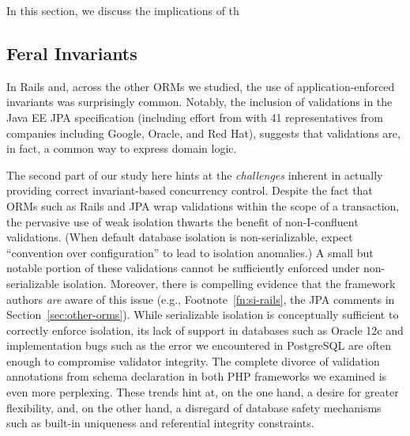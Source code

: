 In this section, we discuss the implications of th

\subsection{Feral Invariants}

In Rails and, across the other ORMs we studied, the use of
application-enforced invariants was surprisingly common. Notably, the
inclusion of validations in the Java EE JPA specification (including
effort from with 41 representatives from companies including Google,
Oracle, and Red Hat), suggests that validations are, in fact, a common
way to express domain logic.

The second part of our study here hints at the \textit{challenges}
inherent in actually providing correct invariant-based concurrency
control. Despite the fact that ORMs such as Rails and JPA wrap
validations within the scope of a transaction, the pervasive use of
weak isolation thwarts the benefit of non-I-confluent
validations. (When default database isolation is non-serializable,
expect ``convention over configuration'' to lead to isolation
anomalies.) A small but notable portion of these validations cannot be
sufficiently enforced under non-serializable isolation. Moreover,
there is compelling evidence that the framework authors \textit{are}
aware of this issue (e.g., Footnote~\ref{fn:si-rails}, the JPA
comments in Section~\ref{sec:other-orms}). While serializable
isolation is conceptually sufficient to correctly enforce isolation,
its lack of support in databases such as Oracle 12c and implementation
bugs such as the error we encountered in PostgreSQL are often enough
to compromise validator integrity. The complete divorce of validation
annotations from schema declaration in both PHP frameworks we examined
is even more perplexing. These trends hint at, on the one hand, a
desire for greater flexibility, and, on the other hand, a disregard of
database safety mechanisms such as built-in uniqueness and referential
integrity constraints.

